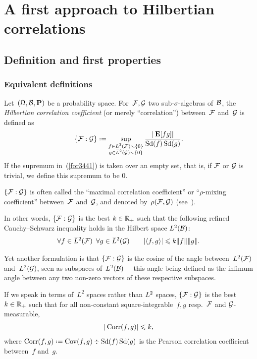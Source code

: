 \chapter{A first approach to Hilbertian correlations}\label{parBasicHilbertianDecorrelations}%

\section{Definition and first properties}\label{parDefinition}

\subsection{Equivalent definitions}

\begin{Def}\label{def4393}
Let~$(\Omega,\mathcal{B},\mathop{\smash{\mathbf{P}}}\nolimits)$ be a probability space.
For~$\mathcal{F}, \allowbreak \mathcal{G}$ two sub-$\sigma$-algebras of~$\mathcal{B}$,
the \emph{Hilbertian correlation coefficient} (or merely ``correlation'')
between~$\mathcal{F}$ and~$\mathcal{G}$ is defined as
\[\label{for3441} \{\mcal{F}:\mcal{G}\}
\coloneqq \sup_{\substack{f\in\ldb(\mcal{F})\setminus\{0\}\\g\in\ldb(\mcal{G})\setminus\{0\}}}
\frac{|\EE[fg]|}{\ecty(f)\ecty(g)} .\]
If the supremum in~(\ref{for3441}) is taken over an empty set,
that is, if $\mathcal{F}$ or $\mathcal{G}$ is trivial,
we define this supremum to be $0$.
\end{Def}

\begin{Rmk}\label{rmk8718}
$\{\mathcal{F}:\mathcal{G}\}$ is often called the ``maximal correlation coefficient'' or ``$\rho$-mixing coefficient'' between~$\mathcal{F}$ and~$\mathcal{G}$, and denoted by~$\rho(\mathcal{F},\mathcal{G})$ (see~\cite{Bradley-review}).
\end{Rmk}

\begin{Rmk}
In other words, $\{\mathcal{F}:\mathcal{G}\}$ is the best $k\in\mathbb{R}_+$ such that the following refined
Cauchy--Schwarz inequality holds in the Hilbert space $\ldb(\mcal{B})$:
\[ \forall f \in \ldb(\mcal{F}) \enskip\forall g \in \ldb(\mcal{G})
\qquad |\langle f,g \rangle| \leq k \|f\| \|g\| .\]

Yet another formulation is that $\{\mathcal{F}:\mathcal{G}\}$ is the cosine of the angle
between~$\ldb(\mcal{F})$ and~$\ldb(\mcal{G})$, seen as subspaces of~$\ldb(\mcal{B})$
—this angle being defined as the infimum angle
between any two non-zero vectors of these respective subspaces.

If we speak in terms of~$L^2$ spaces rather than $\ldb$ spaces,
$\{\mathcal{F}:\mathcal{G}\}$ is the best $k\in\mathbb{R}_+$ such that
for all non-constant square-integrable~$f,g$ resp.\ $\mathcal{F}$ and $\mathcal{G}$-measurable,
\[\label{for0263} |\operatorname{Corr}(f,g)| \leqslant k ,\]
where $\Corr(f,g) \coloneqq \Cov(f,g) \div \ecty(f)\ecty(g)$ is the Pearson correlation coefficient between~$f$ and~$g$.
\end{Rmk}


